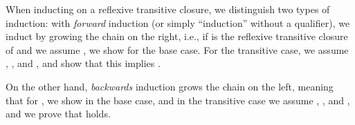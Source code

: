 \begin{isabellebody}
\begin{isamarkuptext}
When inducting on a reflexive transitive closure, we distinguish two types of induction:
with \emph{forward} induction (or simply ``induction'' without a qualifier), we induct by growing the
chain on the right, i.e., if  is the reflexive transitive closure of  and we assume ,
we show  for the base case. For the transitive case, we assume , , and , 
and show that this implies .

On the other hand, \emph{backwards} induction grows the chain on the left, meaning that for 
,
we show  in the base case, and in the transitive case we assume , , and ,
and we prove that  holds.


\end{isamarkuptext}
\end{isabellebody}
